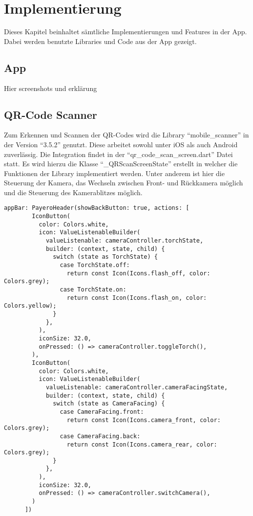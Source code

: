 
\chapter{Implementierung}

Dieses Kapitel beinhaltet sämtliche Implementierungen und Features in der App.
Dabei werden benutzte Libraries und Code aus der App gezeigt.

\section{App}

Hier screenshots und erklärung

\section{QR-Code Scanner}

Zum Erkennen und Scannen der QR-Codes wird die Library ``mobile\_scanner'' in der Version ``3.5.2'' genutzt.
Diese arbeitet sowohl unter iOS als auch Android zuverlässig.
Die Integration findet in der ``qr\_code\_scan\_screen.dart'' Datei statt.
Es wird hierzu die Klasse ``\_QRScanScreenState'' erstellt in welcher die Funktionen der Library implementiert werden.
Unter anderem ist hier die Steuerung der Kamera, das Wechseln zwischen Front- und Rückkamera möglich und die Steuerung des Kamerablitzes möglich.

\begin{lstlisting}[caption=Kamerasteuerung, label=cam_ctrl]
	appBar: PayeroHeader(showBackButton: true, actions: [
        IconButton(
          color: Colors.white,
          icon: ValueListenableBuilder(
            valueListenable: cameraController.torchState,
            builder: (context, state, child) {
              switch (state as TorchState) {
                case TorchState.off:
                  return const Icon(Icons.flash_off, color: Colors.grey);
                case TorchState.on:
                  return const Icon(Icons.flash_on, color: Colors.yellow);
              }
            },
          ),
          iconSize: 32.0,
          onPressed: () => cameraController.toggleTorch(),
        ),
        IconButton(
          color: Colors.white,
          icon: ValueListenableBuilder(
            valueListenable: cameraController.cameraFacingState,
            builder: (context, state, child) {
              switch (state as CameraFacing) {
                case CameraFacing.front:
                  return const Icon(Icons.camera_front, color: Colors.grey);
                case CameraFacing.back:
                  return const Icon(Icons.camera_rear, color: Colors.grey);
              }
            },
          ),
          iconSize: 32.0,
          onPressed: () => cameraController.switchCamera(),
        )
      ])
\end{lstlisting}

